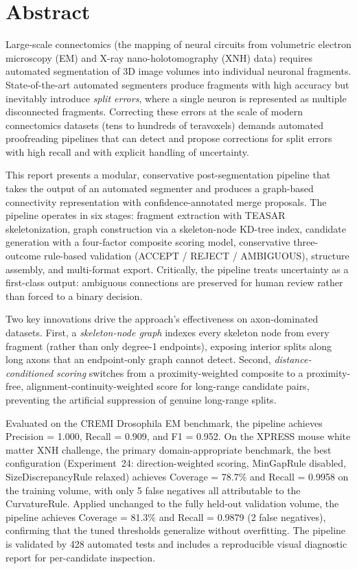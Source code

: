 \chapter*{Abstract}

Large-scale connectomics (the mapping of neural circuits from volumetric
electron microscopy (EM) and X-ray nano-holotomography (XNH) data) requires
automated segmentation of 3D image volumes into individual neuronal
fragments. State-of-the-art automated segmenters produce fragments with high accuracy
but inevitably introduce \emph{split errors}, where a single neuron is represented as
multiple disconnected fragments. Correcting these errors at the scale of modern
connectomics datasets (tens to hundreds of teravoxels) demands automated
proofreading pipelines that can detect and propose corrections for split errors
with high recall and with explicit handling of uncertainty.

This report presents a modular, conservative post-segmentation pipeline that
takes the output of an automated segmenter and produces a graph-based
connectivity representation with confidence-annotated merge proposals. The pipeline
operates in six stages: fragment extraction with TEASAR skeletonization, graph
construction via a skeleton-node KD-tree index, candidate generation with a
four-factor composite scoring model, conservative three-outcome rule-based
validation (ACCEPT / REJECT / AMBIGUOUS), structure assembly, and multi-format
export. Critically, the pipeline treats uncertainty as a first-class output:
ambiguous connections are preserved for human review rather than forced to a
binary decision.

Two key innovations drive the approach's effectiveness on axon-dominated datasets.
First, a \emph{skeleton-node graph} indexes every skeleton node from every fragment
(rather than only degree-1 endpoints), exposing interior splits along long axons
that an endpoint-only graph cannot detect. Second, \emph{distance-conditioned
scoring} switches from a proximity-weighted composite to a proximity-free,
alignment-continuity-weighted score for long-range candidate pairs, preventing
the artificial suppression of genuine long-range splits.

Evaluated on the CREMI Drosophila EM benchmark, the pipeline achieves
Precision = 1.000, Recall = 0.909, and F1 = 0.952. On the XPRESS mouse white
matter XNH challenge, the primary domain-appropriate benchmark, the best
configuration (Experiment~24: direction-weighted scoring, MinGapRule disabled,
SizeDiscrepancyRule relaxed) achieves Coverage = 78.7\% and Recall = 0.9958 on
the training volume, with only 5 false negatives all attributable to the
CurvatureRule. Applied unchanged to the fully held-out validation volume,
the pipeline achieves Coverage = 81.3\% and Recall = 0.9879 (2 false negatives),
confirming that the tuned thresholds generalize without overfitting. The pipeline
is validated by 428 automated tests and includes a reproducible visual diagnostic
report for per-candidate inspection.

